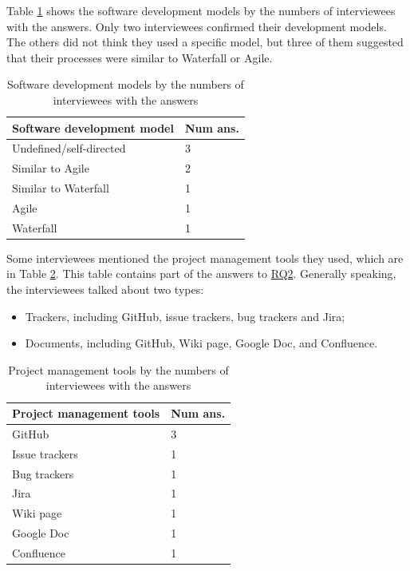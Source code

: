 \documentclass[preprint,12pt,authoryear]{elsarticle}
\begin{document}
Table \ref{tab_developmen_models} shows the software development models by the
numbers of interviewees with the answers. Only two interviewees confirmed their
development models. The others did not think they used a specific model, but
three of them suggested that their processes were similar to Waterfall or Agile.

\begin{table}[ht]
\centering
\begin{tabular}{ll}
\hline
Software development model & Num ans. \\ \hline
Undefined/self-directed & 3 \\
Similar to Agile & 2 \\
Similar to Waterfall & 1 \\
Agile & 1 \\
Waterfall & 1 \\ \hline
\end{tabular}
\caption{\label{tab_developmen_models}Software development models by the numbers
of interviewees with the answers}
\end{table}

Some interviewees mentioned the project management tools they used, which are in
Table \ref{tab_pm_tools}. This table contains part of the answers to
\hyperlink{rq2}{RQ2}. Generally speaking, the interviewees talked about two
types:

\begin{itemize}
\item Trackers, including GitHub, issue trackers, bug trackers and Jira;
\item Documents, including GitHub, Wiki page, Google Doc, and Confluence.
\end{itemize}

\begin{table}[ht]
\centering
\begin{tabular}{ll}
\hline
Project management tools & Num ans. \\ \hline
GitHub & 3 \\
Issue trackers & 1 \\
Bug trackers & 1 \\
Jira & 1 \\
Wiki page & 1 \\
Google Doc & 1 \\
Confluence & 1 \\ \hline
\end{tabular}
\caption{\label{tab_pm_tools}Project management tools by the numbers of
interviewees with the answers}
\end{table}
\end{document}
